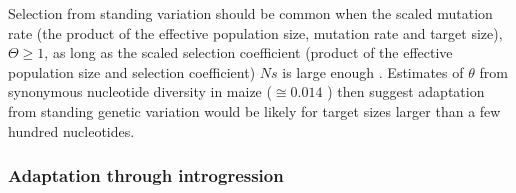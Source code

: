 {{%
Selection from standing variation should be common when the scaled mutation rate (the product of the effective population size, mutation rate and target size), $\Theta\geq1$, as long as the scaled selection coefficient (product of the effective population size and selection coefficient) $Ns$ is large enough \cite[]{Hermisson_2005_15716498}.
Estimates of $\theta$ from synonymous nucleotide diversity in maize ($\cong0.014$ \cite[\emph{e.g.,} ][]{Tenaillon_2004_15014173,Wright_2005_15919994,Ross-Ibarra_2009_19153259}) then suggest adaptation from standing genetic variation would be likely for target sizes larger than a few hundred nucleotides.

\subsubsection{Adaptation through introgression}

}}
